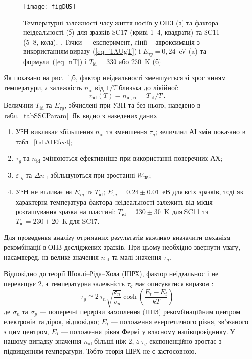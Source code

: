 \begin{figure}
\center
\texttt{[image: figDUS]}%
\caption{\label{figDUS}
Температурні залежності часу життя носіїв у ОПЗ (а) та фактора неідеальності (б)
для зразків SC17 (криві 1--4, квадрати) та SC11 (5--8, кола).
\FigCaptionSSC.
Точки --- експеримент,
лінії -- апроксимація з використанням виразу~(\ref{eq_TAUgT}) і $E_{\tau g}=0,24$~eV (a) та
формули~(\ref{eq_nT}) і $T_\mathrm{id}=330$ або 230~K (б)
}%
\end{figure}

Як показано на рис.~\ref{figDUS},б, фактор неідеальності зменшується зі зростанням температури, а залежність
$n_{\mathrm{id}}$ від $1/T$  близька до лінійної:
\begin{equation}
\label{eq_nT}
    n_{\mathrm{id}}(T)=n_{\mathrm{id},\infty}+T_{\mathrm{id}}/T\:.
\end{equation}
Величини $T_{\mathrm{id}}$ та $E_{\tau g}$, обчислені при УЗН та без нього, наведено в табл.~\ref{tabSSCParam}.
Як видно з наведених даних
\begin{enumerate}[label=\asbuk*),leftmargin=0em,itemindent=1.5em]
\item УЗН викликає збільшення $n_\mathrm{id}$ та зменшення $\tau_{g}$;
   величини АІ змін показано в табл.~\ref{tabAIEfect};
\item $\tau_{g}$ та $n_\mathrm{id}$ змінюються ефективніше при використанні поперечних АХ;
\item $\varepsilon_{\tau g}$ та $\Delta n_\mathrm{id}$ збільшуються при зростанні $W_{\mathtt{US}}$;
\item УЗН не впливає на $E_{\tau g}$ та $T_\mathrm{id}$;
 $E_{\tau g}=0.24\pm0.01$~еВ для всіх зразків,
 тоді як характерна температура фактора неідеальності залежить від місця розташування зразка на пластині: $T_\mathrm{id}=330\pm30$~K для SC11 та $T_\mathrm{id}=230\pm20$~K для SC17.
\end{enumerate}

Для проведення аналізу отриманих результатів важливо визначити механізм рекомбінації в ОПЗ досліджених зразків.
При цьому необхідно звернути увагу, насамперед, на велике значення  $n_{\mathrm{id}}$ та малі значення $\tau_g$.

Відповідно до теорії Шоклі--Ріда--Хола (ШРХ),
фактор неідеальності не перевищує 2, а температурна залежність $\tau_g$ має описуватися виразом \cite{TAUg:Schroder,TAUg:Aharoni}:
\begin{equation}
  \tau_g\simeq2\,\tau_n\sqrt{\frac{\sigma_n}{\sigma_p}}\cosh\left(\frac{E_t-E_i}{kT}\right)
\end{equation}
де
$\sigma_n$ та $\sigma_p$ --- поперечні перерізи захоплення (ППЗ) рекомбінаційним центром електронів та дірок, відповідно;
$E_t$ --- положення енергетичного рівня, зв'язаного з цим центром,
$E_i$  --- положення рівня Фермі у власному напівпровіднику.
У нашому випадку значення $n_{\mathrm{id}}$ більші ніж 2,
а $\tau_g$ експоненційно зростає з підвищенням температури.
Тобто теорія ШРХ не є застосовною.

